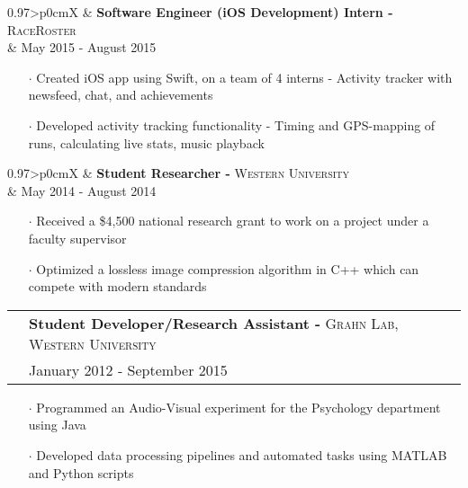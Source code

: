 \documentclass[letterpaper, oneside, final]{scrartcl} %
\newcommand{\gray}{\rowcolor[gray]{.90}} %
\begin{document}
\begin{center}
\begin{tabularx}{0.97\linewidth}{>{\raggedleft\scshape}p{0cm}X}
\gray & \textbf{Software Engineer (iOS Development) Intern -} \textsc{RaceRoster}\\
\gray & {May 2015 - August 2015}\\
\end{tabularx}
\vspace{-0.1cm}
\begin{itemize} \itemsep-0.2cm
\item[$\cdot$] Created iOS app using Swift, on a team of 4 interns - Activity tracker with newsfeed, chat, and achievements \\
\item[$\cdot$] Developed activity tracking functionality - Timing and GPS-mapping of runs, calculating live stats, music playback
\end{itemize}

\vspace{-0.05cm}

\begin{tabularx}{0.97\linewidth}{>{\raggedleft\scshape}p{0cm}X}
\gray & \textbf{Student Researcher -} \textsc{Western University}\\
\gray & {May 2014 - August 2014}\\
\end{tabularx}
\vspace{-0.1cm}
\begin{itemize}\itemsep-0.2cm
\item[$\cdot$] Received a \$4,500 national research grant to work on a project under a faculty supervisor
\item[$\cdot$] Optimized a lossless image compression algorithm in C++ which can compete with modern standards\\
\end{itemize}

\vspace{-0.05cm}

\begin{tabularx}{0.97\linewidth}{>{\raggedleft\scshape}p{0cm}X}
\gray & \textbf{Student Developer/Research Assistant -} \textsc{Grahn Lab, Western University}\\
\gray & {January 2012 - September 2015}\\
\end{tabularx}
\vspace{-0.1cm}
\begin{itemize} \itemsep-0.2cm
\item[$\cdot$] Programmed an Audio-Visual experiment for the Psychology department using Java
\item[$\cdot$] Developed data processing pipelines and automated tasks using MATLAB and Python scripts

\end{itemize}


\end{center}
\end{document}
